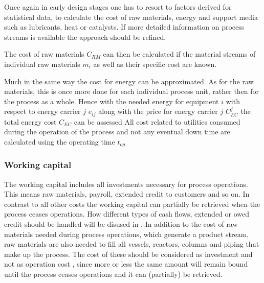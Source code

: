         Once again in early design stages one has to resort to factors derived for statistical data, to calculate
        the cost of raw materials, energy and support media such as lubricants, heat or catalysts. If more
        detailed information on process streams is available the approach should be refined.

        The cost of raw materials $C_{RM}$ can then be calculated if the material streams of individual raw materials
        $m_i$ as well as their specific cost are known.

        Much in the same way the cost for energy can be approximated. As for the raw materials, this is once
        more done for each individual process unit, rather then for the process as a whole. Hence
        with the needed energy for equipment $i$ with respect to energy carrier $j$ $e_{ij}$ along with
        the price for energy carrier $j$ $C_{EC}^j$ the total energy cost $C_{EC}$ can be assessed
        All cost related to utilities consumed during the operation of the process and not any eventual
        down time are calculated using the operating time $t_{op}$

    \subsubsection{Working capital}
        The working capital includes all investments necessary for process operations. This means raw
        materials, payroll, extended credit to customers and so on. In contrast to all other costs the
        working capital can partially be retrieved when the process ceases operations. How different
        types of cash flows, extended or owed credit should be handled will be disused in
        . In addition to the cost of raw materials needed during process
        operations, which generate a product stream, raw materials are also needed to fill all vessels, reactors,
        columns and piping that make up the process. The cost of these should be considered as investment
        and not as operation cost \cite{Coulson.1999}, since more or less the same amount will remain bound until
        the process ceases operations and it can (partially) be retrieved.

